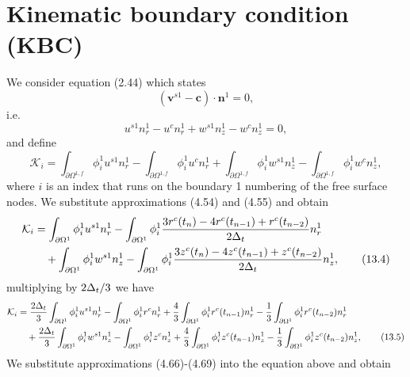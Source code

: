 \documentclass{article}
\begin{document}
\section{Kinematic boundary condition (KBC)} %
We consider equation (2.44) which states
\begin{equation}
(\mathbf{v}^{s1} - \mathbf{c}) \cdot \mathbf{n}^1 = 0, \tag{13.1}
\end{equation}
i.e.
\begin{equation}
u^{s1} n_r^1 - u^c n_r^1 + w^{s1} n_z^1 - w^c n_z^1 = 0, \tag{13.2}
\end{equation}
and define
\begin{equation}
\mathcal{K}_i = \int_{\partial \Omega^{1,f}} \phi_i^1 u^{s1} n_r^1 - \int_{\partial \Omega^{1,f}} \phi_i^1 u^c n_r^1 + \int_{\partial \Omega^{1,f}} \phi_i^1 w^{s1} n_z^1 - \int_{\partial \Omega^{1,f}} \phi_i^1 w^c n_z^1, \tag{13.3}
\end{equation}
where $i$ is an index that runs on the boundary 1 numbering of the free surface nodes.
We substitute approximations (4.54) and (4.55) and obtain
\begin{align}
\mathcal{K}_i &= \int_{\partial \Omega^{1}} \phi_i^1 u^{s1} n_r^1 - \int_{\partial \Omega^{1}} \phi_i^1 \frac{3 r^c(t_n) - 4 r^c(t_{n-1}) + r^c(t_{n-2})}{2 \Delta_t} n_r^1 \nonumber\\
&\quad + \int_{\partial \Omega^{1}} \phi_i^1 w^{s1} n_z^1 - \int_{\partial \Omega^{1}} \phi_i^1 \frac{3 z^c(t_n) - 4 z^c(t_{n-1}) + z^c(t_{n-2})}{2 \Delta_t} n_z^1, \tag{13.4}
\end{align}
multiplying by $2\Delta_t/3$ we have
\begin{align}
\mathcal{K}_i &= \frac{2\Delta_t}{3} \int_{\partial \Omega^{1}} \phi_i^1 u^{s1} n_r^1 - \int_{\partial \Omega^{1}} \phi_i^1 r^c n_r^1 + \frac{4}{3} \int_{\partial \Omega^{1}} \phi_i^1 r^c(t_{n-1}) n_r^1 - \frac{1}{3} \int_{\partial \Omega^{1}} \phi_i^1 r^c(t_{n-2}) n_r^1 \nonumber\\
&\quad + \frac{2\Delta_t}{3} \int_{\partial \Omega^{1}} \phi_i^1 w^{s1} n_z^1 - \int_{\partial \Omega^{1}} \phi_i^1 z^c n_z^1 + \frac{4}{3} \int_{\partial \Omega^{1}} \phi_i^1 z^c(t_{n-1}) n_z^1 - \frac{1}{3} \int_{\partial \Omega^{1}} \phi_i^1 z^c(t_{n-2}) n_z^1, \tag{13.5}
\end{align}
We substitute approximations (4.66)-(4.69) into the equation above and obtain
\end{document}
